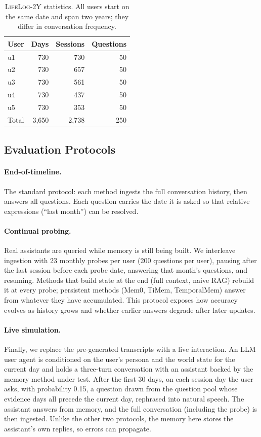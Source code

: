 \documentclass[11pt]{article}
\newcommand{\ours}{TemporalMem}
\newcommand{\dataset}{\textsc{LifeLog-2Y}}
\begin{document}
\begin{table}[t]
  \centering
  \small
  \begin{tabular}{lrrr}
    \toprule
    \textbf{User} & \textbf{Days} & \textbf{Sessions} & \textbf{Questions} \\
    \midrule
    u1 & 730 & 730 & 50 \\
    u2 & 730 & 657 & 50 \\
    u3 & 730 & 561 & 50 \\
    u4 & 730 & 437 & 50 \\
    u5 & 730 & 353 & 50 \\
    \midrule
    Total & 3{,}650 & 2{,}738 & 250 \\
    \bottomrule
  \end{tabular}
  \caption{\dataset{} statistics. All users start on the same date and span two years; they differ in conversation frequency.}
  \label{tab:dataset}
\end{table}

\subsection{Evaluation Protocols}

\paragraph{End-of-timeline.}
The standard protocol: each method ingests the full conversation history, then answers all questions. Each question carries the date it is asked so that relative expressions (``last month'') can be resolved.

\paragraph{Continual probing.}
Real assistants are queried while memory is still being built. We interleave ingestion with 23 monthly probes per user (200 questions per user), pausing after the last session before each probe date, answering that month's questions, and resuming. Methods that build state at the end (full context, naive RAG) rebuild it at every probe; persistent methods (Mem0, TiMem, \ours) answer from whatever they have accumulated. This protocol exposes how accuracy evolves as history grows and whether earlier answers degrade after later updates.

\paragraph{Live simulation.}
Finally, we replace the pre-generated transcripts with a live interaction. An LLM user agent is conditioned on the user's persona and the world state for the current day and holds a three-turn conversation with an assistant backed by the memory method under test. After the first 30 days, on each session day the user asks, with probability 0.15, a question drawn from the question pool whose evidence days all precede the current day, rephrased into natural speech. The assistant answers from memory, and the full conversation (including the probe) is then ingested. Unlike the other two protocols, the memory here stores the assistant's own replies, so errors can propagate.
\end{document}
